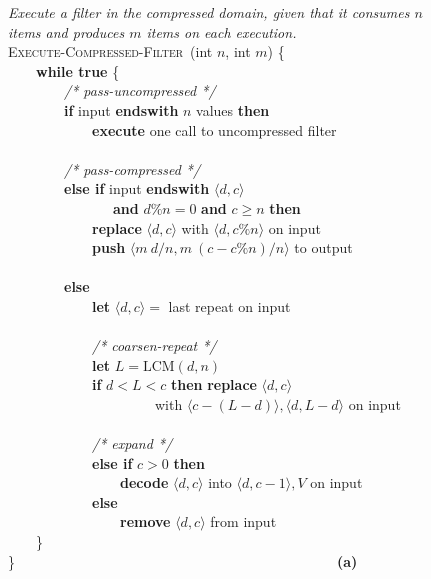 \newcommand{\mynewline}[0]{\\ \vspace{-1pt}}
\begin{figure}[t]
\vspace{-0.4\baselineskip}
\hspace{-33pt}
\begin{minipage}{0.53\textwidth}
\begin{small}
{\it Execute a filter in the compressed domain, given that it consumes
  $n$ items and produces $m$ items on each execution.}\mynewline
\textsc{Execute-Compressed-Filter}~(int $n$, int $m$) \{\mynewline
\mbox{~~~~}{\bf while true} \{\mynewline
\mbox{~~~~}\mbox{~~~~}{\it /* pass-uncompressed */} \mynewline
\mbox{~~~~}\mbox{~~~~}{\bf if} input {\bf endswith} $n$ values {\bf then}\mynewline
\mbox{~~~~}\mbox{~~~~}\mbox{~~~~}{\bf execute} one call to uncompressed filter\mynewline
\mbox{~~~~}\mbox{~~~~}~\mynewline
\mbox{~~~~}\mbox{~~~~}{\it /* pass-compressed */} \mynewline
\mbox{~~~~}\mbox{~~~~}{\bf else if} input {\bf endswith} $\langle d,c \rangle$\mynewline
\mbox{~~~~}\mbox{~~~~}\mbox{~~~~~~~}{\bf and} $d\%n = 0$ {\bf and} $c \geq n$ {\bf then}\mynewline
\mbox{~~~~}\mbox{~~~~}\mbox{~~~~}{\bf replace} $\langle d,c \rangle$ with $\langle d, c\%n\rangle$ on input\mynewline
\mbox{~~~~}\mbox{~~~~}\mbox{~~~~}{\bf push} $\langle m~d/n, m~(c-c\%n)/n \rangle$ to output\mynewline
\mbox{~~~~}\mbox{~~~~}~\mynewline
\mbox{~~~~}\mbox{~~~~}{\bf else}\mynewline
\mbox{~~~~}\mbox{~~~~}\mbox{~~~~}{\bf let} $\langle d,c \rangle = $ last repeat on input\mynewline
\mbox{~~~~}\mbox{~~~~}\mynewline
\mbox{~~~~}\mbox{~~~~}\mbox{~~~~}{\it /* coarsen-repeat */}\mynewline
\mbox{~~~~}\mbox{~~~~}\mbox{~~~~}{\bf let} $L = \mbox{LCM}(d, n)$\mynewline
\mbox{~~~~}\mbox{~~~~}\mbox{~~~~}{\bf if} $d < L < c$ {\bf then} {\bf replace} $\langle d,c \rangle$\mynewline
\mbox{~~~~}\mbox{~~~~}\mbox{~~~~}\mbox{~~~~}\mbox{~~~~~}with $\langle c - (L - d) \rangle, \langle d, L - d\rangle$ on input\mynewline
\mbox{~~~~}\mbox{~~~~}\mynewline
\mbox{~~~~}\mbox{~~~~}\mbox{~~~~}{\it /* expand */}\mynewline
\mbox{~~~~}\mbox{~~~~}\mbox{~~~~}{\bf else if} $c > 0$ {\bf then}\mynewline
\mbox{~~~~}\mbox{~~~~}\mbox{~~~~}\mbox{~~~~}{\bf decode} $\langle d,c \rangle$ into $\langle d,c-1\rangle,V$ on input\mynewline
\mbox{~~~~}\mbox{~~~~}\mbox{~~~~}{\bf else}\mynewline
\mbox{~~~~}\mbox{~~~~}\mbox{~~~~}\mbox{~~~~}{\bf remove} $\langle d,c \rangle$ from input\mynewline
\mbox{~~~~}\}\mynewline
\}~~~~~~~~~~~~~~~~~~~~~~~~~~~~~~~~~~~~~~~~~~~~~~{\bf (a)}\mynewline
\end{small}

\end{minipage}
\end{figure}

